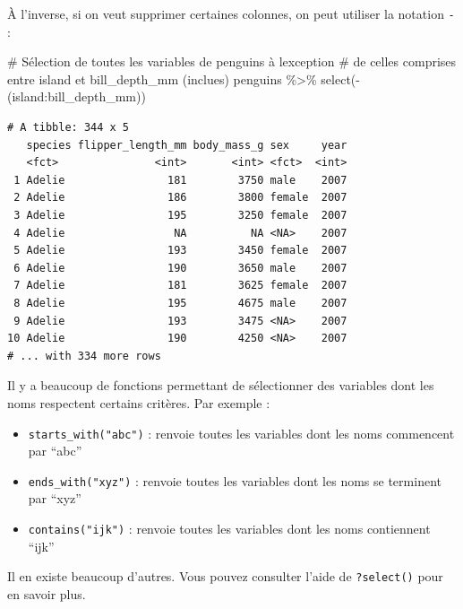 \documentclass[
  letterpaper,
  DIV=11,
  numbers=noendperiod]{scrreprt}
\newenvironment{Shaded}{\begin{snugshade}}{\end{snugshade}}
\newcommand{\CommentTok}[1]{\textcolor[rgb]{0.37,0.37,0.37}{#1}}
\newcommand{\FunctionTok}[1]{\textcolor[rgb]{0.28,0.35,0.67}{#1}}
\newcommand{\NormalTok}[1]{\textcolor[rgb]{0.00,0.23,0.31}{#1}}
\newcommand{\SpecialCharTok}[1]{\textcolor[rgb]{0.37,0.37,0.37}{#1}}
\providecommand{\tightlist}{%
  \setlength{\itemsep}{0pt}\setlength{\parskip}{0pt}}\usepackage{longtable,booktabs,array}
\begin{document}
À l'inverse, si on veut supprimer certaines colonnes, on peut utiliser
la notation \texttt{-} :

\begin{Shaded}
\begin{Highlighting}[]
\CommentTok{\# Sélection de toutes les variables de \textasciigrave{}penguins\textasciigrave{} à l\textquotesingle{}exception}
\CommentTok{\# de celles comprises entre \textasciigrave{}island\textasciigrave{} et \textasciigrave{}bill\_depth\_mm\textasciigrave{} (inclues)}
\NormalTok{penguins }\SpecialCharTok{\%\textgreater{}\%}
  \FunctionTok{select}\NormalTok{(}\SpecialCharTok{{-}}\NormalTok{(island}\SpecialCharTok{:}\NormalTok{bill\_depth\_mm))}
\end{Highlighting}
\end{Shaded}

\begin{verbatim}
# A tibble: 344 x 5
   species flipper_length_mm body_mass_g sex     year
   <fct>               <int>       <int> <fct>  <int>
 1 Adelie                181        3750 male    2007
 2 Adelie                186        3800 female  2007
 3 Adelie                195        3250 female  2007
 4 Adelie                 NA          NA <NA>    2007
 5 Adelie                193        3450 female  2007
 6 Adelie                190        3650 male    2007
 7 Adelie                181        3625 female  2007
 8 Adelie                195        4675 male    2007
 9 Adelie                193        3475 <NA>    2007
10 Adelie                190        4250 <NA>    2007
# ... with 334 more rows
\end{verbatim}

Il y a beaucoup de fonctions permettant de sélectionner des variables
dont les noms respectent certains critères. Par exemple :

\begin{itemize}
\tightlist
\item
  \texttt{starts\_with("abc")} : renvoie toutes les variables dont les
  noms commencent par ``abc''
\item
  \texttt{ends\_with("xyz")} : renvoie toutes les variables dont les
  noms se terminent par ``xyz''
\item
  \texttt{contains("ijk")} : renvoie toutes les variables dont les noms
  contiennent ``ijk''
\end{itemize}

Il en existe beaucoup d'autres. Vous pouvez consulter l'aide de
\texttt{?select()} pour en savoir plus.
\end{document}
